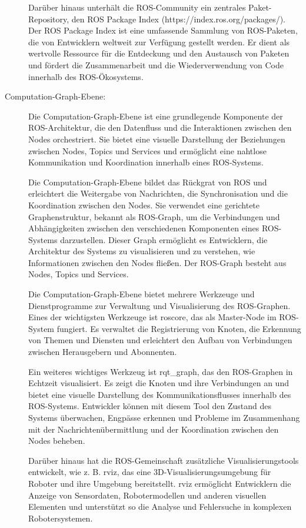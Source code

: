 \begin{description}
    Darüber hinaus unterhält die \ac{ROS}-Community ein zentrales Paket-Repository, den \ac{ROS} Package Index (https://index.ros.org/packages/). Der \ac{ROS} Package Index ist eine umfassende Sammlung von \ac{ROS}-Paketen, die von Entwicklern weltweit zur Verfügung gestellt werden. Er dient als wertvolle Ressource für die Entdeckung und den Austausch von Paketen und fördert die Zusammenarbeit und die Wiederverwendung von Code innerhalb des \ac{ROS}-Ökosystems.
    
    \cite[vgl.][]{filesystem}
    
    
    \item[Computation-Graph-Ebene:] Die Computation-Graph-Ebene ist eine grundlegende Komponente der \ac{ROS}-Architektur, die den Datenfluss und die Interaktionen zwischen den Nodes orchestriert. Sie bietet eine visuelle Darstellung der Beziehungen zwischen Nodes, Topics und Services und ermöglicht eine nahtlose Kommunikation und Koordination innerhalb eines \ac{ROS}-Systems.

    Die Computation-Graph-Ebene bildet das Rückgrat von \ac{ROS} und erleichtert die Weitergabe von Nachrichten, die Synchronisation und die Koordination zwischen den Nodes. Sie verwendet eine gerichtete Graphenstruktur, bekannt als ROS-Graph, um die Verbindungen und Abhängigkeiten zwischen den verschiedenen Komponenten eines \ac{ROS}-Systems darzustellen. Dieser Graph ermöglicht es Entwicklern, die Architektur des Systems zu visualisieren und zu verstehen, wie Informationen zwischen den Nodes fließen. Der ROS-Graph besteht aus Nodes, Topics und Services.
    
    Die Computation-Graph-Ebene bietet mehrere Werkzeuge und Dienstprogramme zur Verwaltung und Visualisierung des ROS-Graphen. Eines der wichtigsten Werkzeuge ist roscore, das als Master-Node im ROS-System fungiert. Es verwaltet die Registrierung von Knoten, die Erkennung von Themen und Diensten und erleichtert den Aufbau von Verbindungen zwischen Herausgebern und Abonnenten.
    
    Ein weiteres wichtiges Werkzeug ist rqt\_graph, das den ROS-Graphen in Echtzeit visualisiert. Es zeigt die Knoten und ihre Verbindungen an und bietet eine visuelle Darstellung des Kommunikationsflusses innerhalb des \ac{ROS}-Systems. Entwickler können mit diesem Tool den Zustand des Systems überwachen, Engpässe erkennen und Probleme im Zusammenhang mit der Nachrichtenübermittlung und der Koordination zwischen den Nodes beheben. \cite[vgl.][]{rqt-graph}
    
    Darüber hinaus hat die \ac{ROS}-Gemeinschaft zusätzliche Visualisierungstools entwickelt, wie z. B. rviz, das eine 3D-Visualisierungsumgebung für Roboter und ihre Umgebung bereitstellt. rviz ermöglicht Entwicklern die Anzeige von Sensordaten, Robotermodellen und anderen visuellen Elementen und unterstützt so die Analyse und Fehlersuche in komplexen Robotersystemen.
    

\end{description}
